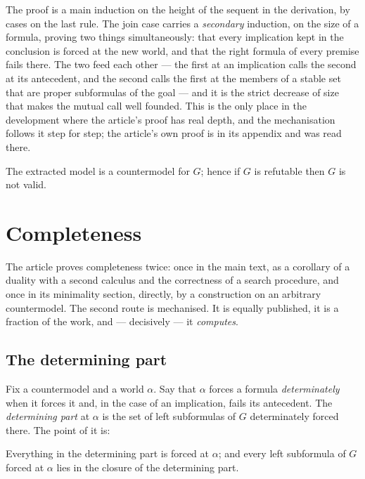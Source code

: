 \documentclass[11pt,a4paper]{article}
\begin{document}
The proof is a main induction on the height of the sequent in the
derivation, by cases on the last rule. The join case carries a
\emph{secondary} induction, on the size of a formula, proving two things
simultaneously: that every implication kept in the conclusion is forced at
the new world, and that the right formula of every premise fails there.
The two feed each other --- the first at an implication calls the second
at its antecedent, and the second calls the first at the members of a
stable set that are proper subformulas of the goal --- and it is the
strict decrease of size that makes the mutual call well founded. This is
the only place in the development where the article's proof has real
depth, and the mechanisation follows it step for step; the article's own
proof is in its appendix and was read there.

\begin{theorem}
The extracted model is a countermodel for $G$; hence if $G$ is refutable
then $G$ is not valid.
\end{theorem}

\section{Completeness}
\label{sec:complete}

The article proves completeness twice: once in the main text, as a
corollary of a duality with a second calculus and the correctness of a
search procedure, and once in its minimality section, directly, by a
construction on an arbitrary countermodel. The second route is
mechanised. It is equally published, it is a fraction of the work, and ---
decisively --- it \emph{computes}.

\subsection{The determining part}

Fix a countermodel and a world $\alpha$. Say that $\alpha$ forces a
formula \emph{determinately} when it forces it and, in the case of an
implication, fails its antecedent. The \emph{determining part} at $\alpha$
is the set of left subformulas of $G$ determinately forced there. The
point of it is:

\begin{lemma}
\label{lem:det}
Everything in the determining part is forced at $\alpha$; and every left
subformula of $G$ forced at $\alpha$ lies in the closure of the
determining part.
\end{lemma}
\end{document}

